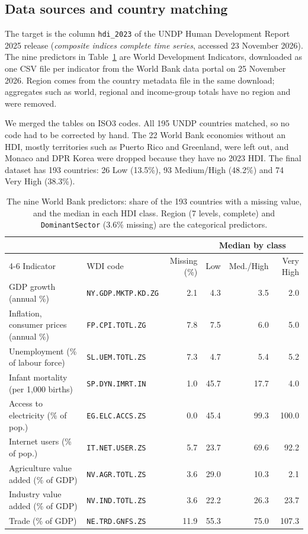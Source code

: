 \documentclass[10pt,a4paper]{article}
\newcommand{\code}[1]{\texttt{\small #1}}
\begin{document}
\subsection{Data sources and country matching}
The target is the column \code{hdi\_2023} of the UNDP Human Development Report 2025 release (\emph{composite
indices complete time series}, accessed 23 November 2026). The nine predictors in Table~\ref{tab:data} are World
Development Indicators, downloaded as one CSV file per indicator from the World Bank data portal on 25 November
2026. Region comes from the country metadata file in the same download; aggregates such as world, regional and
income-group totals have no region and were removed.

We merged the tables on ISO3 codes. All 195 UNDP countries matched, so no code had to be corrected by hand. The 22
World Bank economies without an HDI, mostly territories such as Puerto Rico and Greenland, were left out, and
Monaco and DPR Korea were dropped because they have no 2023 HDI. The final dataset has 193 countries: 26 Low
(13.5\%), 93 Medium/High (48.2\%) and 74 Very High (38.3\%).

\begin{table}[!htb]
\centering\small
\begin{tabular}{llrrrr}
\toprule
 & & & \multicolumn{3}{c}{Median by class}\\
\cmidrule(lr){4-6}
Indicator & WDI code & Missing (\%) & Low & Med./High & Very High\\
\midrule
GDP growth (annual \%) & \code{NY.GDP.MKTP.KD.ZG} & 2.1 & 4.3 & 3.5 & 2.0\\
Inflation, consumer prices (annual \%) & \code{FP.CPI.TOTL.ZG} & 7.8 & 7.5 & 6.0 & 5.0\\
Unemployment (\% of labour force) & \code{SL.UEM.TOTL.ZS} & 7.3 & 4.7 & 5.4 & 5.2\\
Infant mortality (per 1{,}000 births) & \code{SP.DYN.IMRT.IN} & 1.0 & 45.7 & 17.7 & 4.0\\
Access to electricity (\% of pop.) & \code{EG.ELC.ACCS.ZS} & 0.0 & 45.4 & 99.3 & 100.0\\
Internet users (\% of pop.) & \code{IT.NET.USER.ZS} & 5.7 & 23.7 & 69.6 & 92.2\\
Agriculture value added (\% of GDP) & \code{NV.AGR.TOTL.ZS} & 3.6 & 29.0 & 10.3 & 2.1\\
Industry value added (\% of GDP) & \code{NV.IND.TOTL.ZS} & 3.6 & 22.2 & 26.3 & 23.7\\
Trade (\% of GDP) & \code{NE.TRD.GNFS.ZS} & 11.9 & 55.3 & 75.0 & 107.3\\
\bottomrule
\end{tabular}
\caption{The nine World Bank predictors: share of the 193 countries with a missing value, and the median in each
HDI class. Region (7 levels, complete) and \code{DominantSector} (3.6\% missing) are the categorical predictors.}
\label{tab:data}
\end{table}
\end{document}
